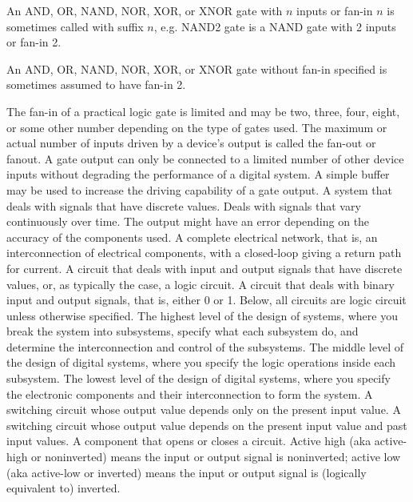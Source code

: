 \documentclass[a4paper,12pt]{report}
\begin{document}
An AND, OR, NAND, NOR, XOR, or XNOR gate with $n$ inputs or fan-in $n$ is sometimes called with suffix $n$, e.g. NAND2 gate is a NAND gate with 2 inputs or fan-in 2.

An AND, OR, NAND, NOR, XOR, or XNOR gate without fan-in specified is sometimes assumed to have fan-in 2.

The fan-in of a practical logic gate is limited and may be two, three, four, eight, or some other number depending on the type of gates used.
The maximum or actual number of inputs driven by a device's output is called the fan-out or fanout.
A gate output can only be connected to a limited number of other device inputs without degrading the performance of a digital system. A simple buffer may be used to increase the driving capability of a gate output.
A system that deals with signals that have discrete values.
Deals with signals that vary continuously over time. The output might have an error depending on the accuracy of the components used.
A complete electrical network, that is, an interconnection of electrical components, with a closed-loop giving a return path for current.
A circuit that deals with input and output signals that have discrete values, or, as typically the case, a logic circuit.
A circuit that deals with binary input and output signals, that is, either 0 or 1. Below, all circuits are logic circuit unless otherwise specified.
The highest level of the design of systems, where you break the system into subsystems, specify what each subsystem do, and determine the interconnection and control of the subsystems.
The middle level of the design of digital systems, where you specify the logic operations inside each subsystem.
The lowest level of the design of digital systems, where you specify the electronic components and their interconnection to form the system.
A switching circuit whose output value depends only on the present input value.
A switching circuit whose output value depends on the present input value and past input values.
A component that opens or closes a circuit.
Active high (aka active-high or noninverted) means the input or output signal is noninverted; active low (aka active-low or inverted) means the input or output signal is (logically equivalent to) inverted.
\end{document}
